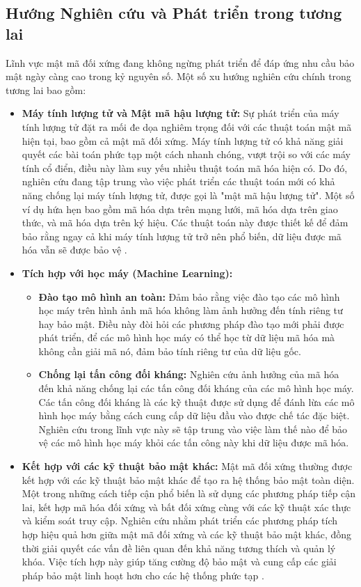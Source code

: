 \subsection{Hướng Nghiên cứu và Phát triển trong tương lai}
Lĩnh vực mật mã đối xứng đang không ngừng phát triển để đáp ứng nhu cầu bảo mật ngày càng cao trong kỷ nguyên số. Một số xu hướng nghiên cứu chính trong tương lai bao gồm:
\begin{itemize}
    \item \textbf{Máy tính lượng tử và Mật mã hậu lượng tử:} Sự phát triển của máy tính lượng tử đặt ra mối đe dọa nghiêm trọng đối với các thuật toán mật mã hiện tại, bao gồm cả mật mã đối xứng. Máy tính lượng tử có khả năng giải quyết các bài toán phức tạp một cách nhanh chóng, vượt trội so với các máy tính cổ điển, điều này làm suy yếu nhiều thuật toán mã hóa hiện có. Do đó, nghiên cứu đang tập trung vào việc phát triển các thuật toán mới có khả năng chống lại máy tính lượng tử, được gọi là "mật mã hậu lượng tử". Một số ví dụ hứa hẹn bao gồm mã hóa dựa trên mạng lưới, mã hóa dựa trên giao thức, và mã hóa dựa trên ký hiệu. Các thuật toán này được thiết kế để đảm bảo rằng ngay cả khi máy tính lượng tử trở nên phổ biến, dữ liệu được mã hóa vẫn sẽ được bảo vệ \cite{saberikamarposhti2024comprehensive}.
    \item \textbf{Tích hợp với học máy (Machine Learning):}
    \begin{itemize}
        \item \textbf{Đào tạo mô hình an toàn:} Đảm bảo rằng việc đào tạo các mô hình học máy trên hình ảnh mã hóa không làm ảnh hưởng đến tính riêng tư hay bảo mật. Điều này đòi hỏi các phương pháp đào tạo mới phải được phát triển, để các mô hình học máy có thể học từ dữ liệu mã hóa mà không cần giải mã nó, đảm bảo tính riêng tư của dữ liệu gốc.
        \item \textbf{Chống lại tấn công đối kháng:} Nghiên cứu ảnh hưởng của mã hóa đến khả năng chống lại các tấn công đối kháng của các mô hình học máy. Các tấn công đối kháng là các kỹ thuật được sử dụng để đánh lừa các mô hình học máy bằng cách cung cấp dữ liệu đầu vào được chế tác đặc biệt. Nghiên cứu trong lĩnh vực này sẽ tập trung vào việc làm thế nào để bảo vệ các mô hình học máy khỏi các tấn công này khi dữ liệu được mã hóa.
    \end{itemize}
    \item \textbf{Kết hợp với các kỹ thuật bảo mật khác:} Mật mã đối xứng thường được kết hợp với các kỹ thuật bảo mật khác để tạo ra hệ thống bảo mật toàn diện. Một trong những cách tiếp cận phổ biến là sử dụng các phương pháp tiếp cận lai, kết hợp mã hóa đối xứng và bất đối xứng cùng với các kỹ thuật xác thực và kiểm soát truy cập. Nghiên cứu nhằm phát triển các phương pháp tích hợp hiệu quả hơn giữa mật mã đối xứng và các kỹ thuật bảo mật khác, đồng thời giải quyết các vấn đề liên quan đến khả năng tương thích và quản lý khóa. Việc tích hợp này giúp tăng cường độ bảo mật và cung cấp các giải pháp bảo mật linh hoạt hơn cho các hệ thống phức tạp \cite{saberikamarposhti2024comprehensive}.

\end{itemize}
